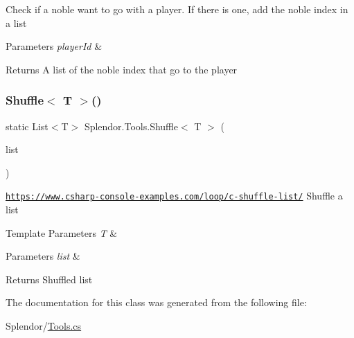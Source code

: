 Check if a noble want to go with a player. If there is one, add the noble index in a list 


\begin{DoxyParams}{Parameters}
{\em player\+Id} & \\
\hline
\end{DoxyParams}
\begin{DoxyReturn}{Returns}
A list of the noble index that go to the player
\end{DoxyReturn}
\mbox{\label{class_splendor_1_1_tools_a0d5b64a510a1553cdbc840a0b01ffb3e}} 
\subsubsection{\texorpdfstring{Shuffle$<$ T $>$()}{Shuffle< T >()}}
{\footnotesize\ttfamily static List$<$T$>$ Splendor.\+Tools.\+Shuffle$<$ T $>$ (\begin{DoxyParamCaption}\item[{List$<$ T $>$}]{list }\end{DoxyParamCaption})\hspace{0.3cm}{\ttfamily [static]}}



\href{https://www.csharp-console-examples.com/loop/c-shuffle-list/}{\tt https\+://www.\+csharp-\/console-\/examples.\+com/loop/c-\/shuffle-\/list/} Shuffle a list 


\begin{DoxyTemplParams}{Template Parameters}
{\em T} & \\
\hline
\end{DoxyTemplParams}

\begin{DoxyParams}{Parameters}
{\em list} & \\
\hline
\end{DoxyParams}
\begin{DoxyReturn}{Returns}
Shuffled list
\end{DoxyReturn}


The documentation for this class was generated from the following file\+:\begin{DoxyCompactItemize}
\item 
Splendor/\hyperlink{_tools_8cs}{Tools.\+cs}\end{DoxyCompactItemize}
